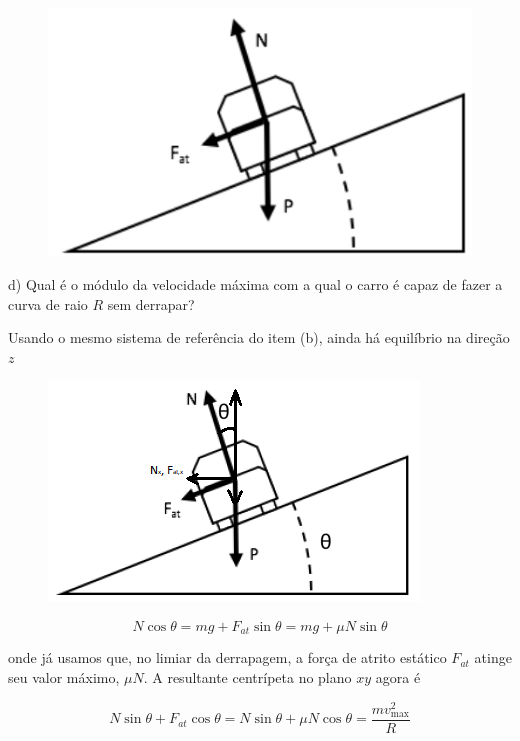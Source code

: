 \begin{enumerate}[start=1,label={\bfseries Q\arabic*.}]
\begin{figure}[H]
\centering
\includegraphics[scale=0.8]{classica-img/inclina2c}
\end{figure}



d) Qual é o módulo da velocidade máxima com a qual o carro é capaz de fazer a curva de raio $R$ sem derrapar?

\resposta Usando o mesmo sistema de referência do item (b), ainda há equilíbrio na direção $z$

\begin{figure}[H]
	\centering
	\includegraphics[scale=0.8]{classica-img/inclina2}
\end{figure}

\begin{equation}\label{eq:atrito}
N \cos \theta=m g+F_{a t} \sin \theta=m g+\mu N \sin \theta
\end{equation}

onde já usamos que, no limiar da derrapagem, a força de atrito estático $F_{at}$ atinge seu valor máximo, $\mu N$. A resultante centrípeta no plano $xy$ agora é

\begin{equation}\label{eq:res-centrip}
N \sin \theta+F_{a t} \cos \theta=N \sin \theta+\mu N \cos \theta=\frac{m v_{\max }^{2}}{R}
\end{equation}


\end{enumerate}
